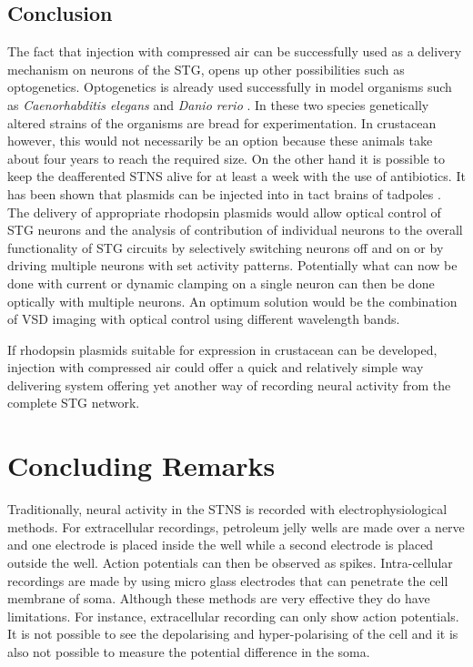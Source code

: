 \subsection{Conclusion}
The fact that injection with compressed air can be successfully used as a delivery mechanism on neurons of the \ac{STG}, opens up other possibilities such as optogenetics. Optogenetics is already used successfully in model organisms such as \textit{Caenorhabditis elegans} \cite{Husson2013} and \textit{Danio rerio} \cite{DelBene2012}. In these two species genetically altered strains of the organisms are bread for experimentation. In crustacean however, this would not necessarily be an option because these animals take about four years to reach the required size. On the other hand it is possible to keep the deafferented \ac{STNS} alive for at least a week with the use of antibiotics. It has been shown that plasmids can be injected into in tact brains of  tadpoles \cite{Hewapathirane2008, Haas2001}. The delivery of appropriate rhodopsin plasmids would allow optical control of \ac{STG} neurons and the analysis of contribution of individual neurons to the overall functionality of \ac{STG} circuits by selectively switching neurons off and on or by driving multiple neurons with set activity patterns. Potentially what can now be done with current or dynamic clamping on a single neuron can then be done optically with multiple neurons. An optimum solution would be the combination of \ac{VSD} imaging with optical control using different wavelength bands.

If rhodopsin plasmids suitable for expression in crustacean can be developed, injection with compressed air could offer a quick and relatively simple way delivering system offering yet another way of recording neural activity from the complete \ac{STG} network.

\section{Concluding Remarks}
\label{sec:alternative_methods}
Traditionally, neural activity in the \ac{STNS} is recorded with electrophysiological methods. For extracellular recordings, petroleum jelly wells are made over a nerve and one electrode is placed inside the well while a second electrode is placed outside the well. Action potentials can then be observed as spikes. Intra-cellular recordings are made by using micro glass electrodes that can penetrate the cell membrane of soma. Although these methods are very effective they do have limitations. For instance, extracellular recording can only show action potentials. It is not possible to see the depolarising and hyper-polarising of the cell and it is also not possible to measure the potential difference in the soma.

